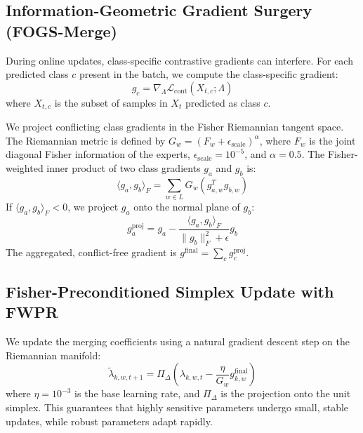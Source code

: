 \documentclass{article}
\theoremstyle{plain}
\theoremstyle{definition}
\theoremstyle{remark}
\begin{document}
\subsection{Information-Geometric Gradient Surgery (FOGS-Merge)}
During online updates, class-specific contrastive gradients can interfere. For each predicted class $c$ present in the batch, we compute the class-specific gradient:
\begin{equation}
g_c = \nabla_{\Lambda} \mathcal{L}_{\text{cont}}(X_{t, c}; \Lambda)
\end{equation}
where $X_{t, c}$ is the subset of samples in $X_t$ predicted as class $c$.

We project conflicting class gradients in the Fisher Riemannian tangent space. The Riemannian metric is defined by $G_w = (F_w + \epsilon_{\text{scale}})^\alpha$, where $F_w$ is the joint diagonal Fisher information of the experts, $\epsilon_{\text{scale}} = 10^{-5}$, and $\alpha = 0.5$. The Fisher-weighted inner product of two class gradients $g_a$ and $g_b$ is:
\begin{equation}
\langle g_a, g_b \rangle_F = \sum_{w \in L} G_w (g_{a,w}^T g_{b,w})
\end{equation}
If $\langle g_a, g_b \rangle_F < 0$, we project $g_a$ onto the normal plane of $g_b$:
\begin{equation}
g_a^{\text{proj}} = g_a - \frac{\langle g_a, g_b \rangle_F}{\|g_b\|_F^2 + \epsilon} g_b
\end{equation}
The aggregated, conflict-free gradient is $g^{\text{final}} = \sum_c g_c^{\text{proj}}$.

\subsection{Fisher-Preconditioned Simplex Update with FWPR}
We update the merging coefficients using a natural gradient descent step on the Riemannian manifold:
\begin{equation}
\tilde{\lambda}_{k,w,t+1} = \Pi_{\Delta} \left( \lambda_{k,w,t} - \frac{\eta}{G_w} g^{\text{final}}_{k,w} \right)
\end{equation}
where $\eta = 10^{-3}$ is the base learning rate, and $\Pi_{\Delta}$ is the projection onto the unit simplex. This guarantees that highly sensitive parameters undergo small, stable updates, while robust parameters adapt rapidly.
\end{document}
